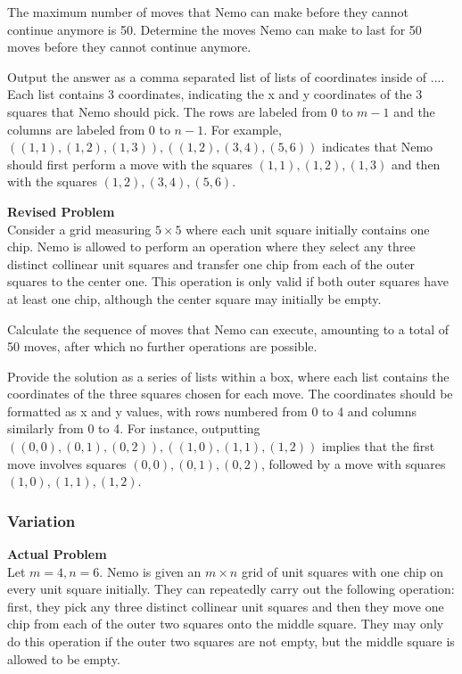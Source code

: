 The maximum number of moves that Nemo can make before they cannot continue anymore is 50. Determine the moves Nemo can make to last for 50 moves before they cannot continue anymore.

Output the answer as a comma separated list of lists of coordinates inside of $\boxed{...}$. Each list contains 3 coordinates, indicating the x and y coordinates of the 3 squares that Nemo should pick. The rows are labeled from $0$ to $m-1$ and the columns are labeled from $0$ to $n-1$. For example, $\boxed{((1,1),(1,2),(1,3)),((1,2),(3,4),(5,6))}$ indicates that Nemo should first perform a move with the squares $(1,1), (1,2), (1,3)$ and then with the squares $(1,2),(3,4),(5,6)$.

\textbf{Revised Problem}\\
Consider a grid measuring $5 \times 5$ where each unit square initially contains one chip. Nemo is allowed to perform an operation where they select any three distinct collinear unit squares and transfer one chip from each of the outer squares to the center one. This operation is only valid if both outer squares have at least one chip, although the center square may initially be empty.

Calculate the sequence of moves that Nemo can execute, amounting to a total of 50 moves, after which no further operations are possible.

Provide the solution as a series of lists within a box, where each list contains the coordinates of the three squares chosen for each move. The coordinates should be formatted as x and y values, with rows numbered from 0 to 4 and columns similarly from 0 to 4. For instance, outputting $\boxed{((0,0),(0,1),(0,2)),((1,0),(1,1),(1,2))}$ implies that the first move involves squares $(0,0), (0,1), (0,2)$, followed by a move with squares $(1,0),(1,1),(1,2)$.

\subsubsection{Variation}
\textbf{Actual Problem}\\
Let $m = 4, n = 6$. Nemo is given an $m \times n$ grid of unit squares with one chip on every unit square initially. They can repeatedly carry out the following operation: first, they pick any three distinct collinear unit squares and then they move one chip from each of the outer two squares onto the middle square. They may only do this operation if the outer two squares are not empty, but the middle square is allowed to be empty. 

